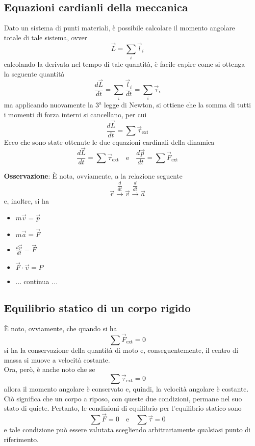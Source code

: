 \documentclass[a4paper]{extarticle}
\begin{document}
\vspace{1em}
\subsection{Equazioni cardianli della meccanica}
Dato un sistema di punti materiali, è possibile calcolare il momento angolare totale di tale sistema, ovver
\[\vec L = \sum_i \vec l_i\]
calcolando la derivata nel tempo di tale quantità, è facile capire come si ottenga la seguente quantità
\[\frac{d \vec L}{dt} = \sum_i \frac{\vec l_i}{dt} = \sum_i \vec \tau_i\]
ma applicando nuovamente la $3^\text{a}$ legge di Newton, si ottiene che la somma di tutti i momenti di forza interni si cancellano, per cui
\[\frac{d \vec L}{dt} = \sum \vec \tau_{\text{ext}}\]
Ecco che sono state ottenute le due equazioni cardinali della dinamica
\[\boxed{\frac{d \vec L}{dt} = \sum \vec \tau_{\text{ext}}} \hspace{1em} \text{e} \hspace{1em} \boxed{\frac{d \vec p}{dt} = \sum \vec F_{\text{ext}}}\]

\vspace{1em}
\noindent
\textbf{Osservazione}: È nota, ovviamente, a la relazione seguente
\[\vec r \overset{\dfrac{d}{dt}}{\longrightarrow} \vec v \overset{\dfrac{d}{dt}}{\longrightarrow} \vec a\]
e, inoltre, si ha
\begin{itemize}
  \item $m \vec v = \vec p$
  \item $m \vec a = \vec F$
  \item $\frac{d \vec p}{dt} = \vec F$
  \item $\vec F \cdot \vec v = P$
  \item ... continua ...
\end{itemize}


\vspace{1em}
\subsection{Equilibrio statico di un corpo rigido}
È noto, ovviamente, che quando si ha
\[\sum \vec F_{\text{ext}} = 0\]
si ha la conservazione della quantità di moto e, conseguentemente, il centro di massa si muove a velocità costante.\\
Ora, però, è anche noto che se
\[\sum \vec \tau_{\text{ext}} = 0\]
allora il momento angolare è conservato e, quindi, la velocità angolare è costante.\\
Ciò significa che un corpo a riposo, con queste due condizioni, permane nel suo stato di quiete. Pertanto, le condizioni di equilibrio per l'equilibrio statico sono
\[\boxed{\sum \vec F = 0} \hspace{1em} \text{e} \hspace{1em} \boxed{\sum \vec \tau = 0}\]
e tale condizione può essere valutata scegliendo arbitrariamente qualsiasi punto di riferimento.
\end{document}
